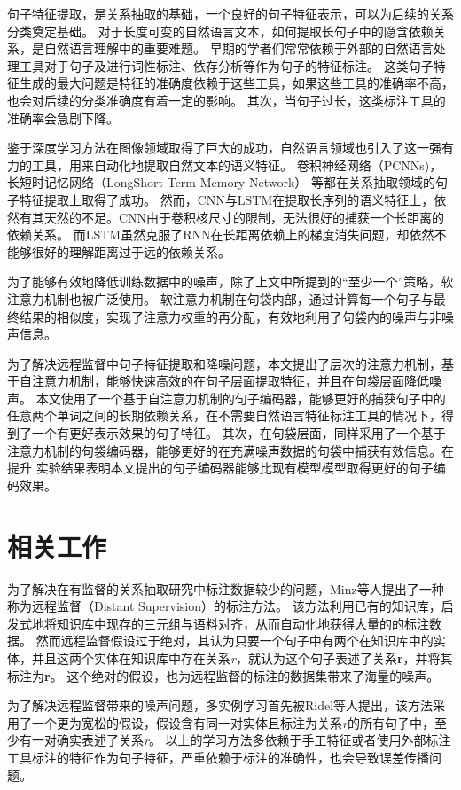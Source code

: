 \documentclass[UTF8]{csoarticle}
\begin{document}
句子特征提取，是关系抽取的基础，一个良好的句子特征表示，可以为后续的关系分类奠定基础。
对于长度可变的自然语言文本，如何提取长句子中的隐含依赖关系，是自然语言理解中的重要难题。
早期的学者们常常依赖于外部的自然语言处理工具对于句子及进行词性标注、依存分析等作为句子的特征标注。
这类句子特征生成的最大问题是特征的准确度依赖于这些工具，如果这些工具的准确率不高，也会对后续的分类准确度有着一定的影响。
其次，当句子过长，这类标注工具的准确率会急剧下降。

鉴于深度学习方法在图像领域取得了巨大的成功，自然语言领域也引入了这一强有力的工具，用来自动化地提取自然文本的语义特征。
卷积神经网络（PCNNs)\cite{bib3}，长短时记忆网络（LongShort Term Memory Network）\cite{bib4} 等都在关系抽取领域的句子特征提取上取得了成功。
然而，CNN与LSTM在提取长序列的语义特征上，依然有其天然的不足。CNN由于卷积核尺寸的限制，无法很好的捕获一个长距离的依赖关系。
而LSTM虽然克服了RNN在长距离依赖上的梯度消失问题，却依然不能够很好的理解距离过于远的依赖关系。

为了能够有效地降低训练数据中的噪声，除了上文中所提到的“至少一个”策略，软注意力机制也被广泛使用。
软注意力机制在句袋内部，通过计算每一个句子与最终结果的相似度，实现了注意力权重的再分配，有效地利用了句袋内的噪声与非噪声信息。

为了解决远程监督中句子特征提取和降噪问题，本文提出了层次的注意力机制，基于自注意力机制，能够快速高效的在句子层面提取特征，并且在句袋层面降低噪声。
本文使用了一个基于自注意力机制的句子编码器，能够更好的捕获句子中的任意两个单词之间的长期依赖关系，在不需要自然语言特征标注工具的情况下，得到了一个有更好表示效果的句子特征。
其次，在句袋层面，同样采用了一个基于注意力机制的句袋编码器，能够更好的在充满噪声数据的句袋中捕获有效信息。在提升
实验结果表明本文提出的句子编码器能够比现有模型模型取得更好的句子编码效果。

\section{相关工作}
为了解决在有监督的关系抽取研究中标注数据较少的问题，Minz\cite{bib1}等人提出了一种称为远程监督（Distant Supervision）的标注方法。
该方法利用已有的知识库，启发式地将知识库中现存的三元组与语料对齐，从而自动化地获得大量的的标注数据。
然而远程监督假设过于绝对，其认为只要一个句子中有两个在知识库中的实体，并且这两个实体在知识库中存在关系\textit{r}，就认为这个句子表述了关系\textbf{r}，并将其标注为\textbf{r}。
这个绝对的假设，也为远程监督的标注的数据集带来了海量的噪声。

为了解决远程监督带来的噪声问题，多实例学习首先被Ridel\cite{bib2}等人提出，该方法采用了一个更为宽松的假设，假设含有同一对实体且标注为关系\textit{r}的所有句子中，至少有一对确实表述了关系\textit{r}。
以上的学习方法多依赖于手工特征或者使用外部标注工具标注的特征作为句子特征，严重依赖于标注的准确性，也会导致误差传播问题。
\end{document}
